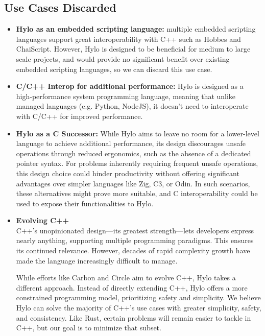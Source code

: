 \subsection{Use Cases Discarded}
\begin{itemize}
  \item \textbf{Hylo as an embedded scripting language:} multiple embedded scripting languages support great interoperability with C++ such as Hobbes and ChaiScript. %
  However, Hylo is designed to be beneficial for medium to large scale projects, and would provide no significant benefit over existing embedded scripting languages, so we can discard this use case.
  \item \textbf{C/C++ Interop for additional performance:} Hylo is designed as a high-performance system programming language, meaning that unlike managed languages (e.g. Python, NodeJS), it doesn't need to interoperate with C/C++ for improved performance.
  \item \textbf{Hylo as a C Successor:} While Hylo aims to leave no room for a lower-level language to achieve additional performance, its design discourages unsafe operations through reduced ergonomics, such as the absence of a dedicated pointer syntax. For problems inherently requiring frequent unsafe operations, this design choice could hinder productivity without offering significant advantages over simpler languages like Zig, C3, or Odin. In such scenarios, these alternatives might prove more suitable, and C interoperability could be used to expose their functionalities to Hylo.

\item \textbf{Evolving C++}\\
  C++'s unopinionated design—its greatest strength—lets developers express nearly anything, supporting multiple programming paradigms. This ensures its continued relevance. However, decades of rapid complexity growth have made the language increasingly difficult to manage.

  While efforts like Carbon and Circle aim to evolve C++, Hylo takes a different approach. Instead of directly extending C++, Hylo offers a more constrained programming model, prioritizing safety and simplicity. We believe Hylo can solve the majority of C++'s use cases with greater simplicity, safety, and consistency. Like Rust, certain problems will remain easier to tackle in C++, but our goal is to minimize that subset.
\end{itemize}
